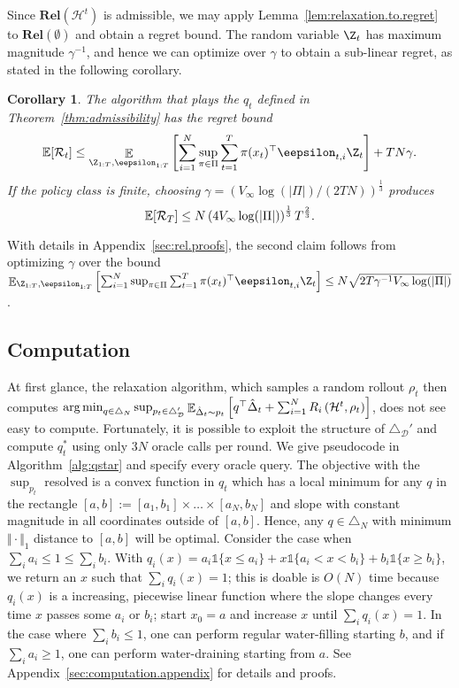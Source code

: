 \documentclass{article}
\newcommand{\exop}{\mathop{\ex}}
\newcommand{\regret}{\mathcal{R}}
\newcommand{\rel}{\mathbf{Rel}}
\newcommand{\hist}{{\mathcal H}}
\newtheorem{corollary}{Corollary}
\begin{document}
Since $\rel(\hist^t)$ is admissible, we may apply Lemma~\ref{lem:relaxation.to.regret} to $\rel(\emptyset)$ and obtain a regret bound. The random variable $\Z_t$ has maximum magnitude $\gamma^{-1}$, and hence we can optimize over $\gamma$ to obtain a sub-linear regret, as stated in the following corollary.
\begin{corollary}\label{cor:oracle.regret.bound}
  The algorithm that plays the $q_t$ defined in Theorem~\ref{thm:admissibility} has the regret bound
  \begin{equation*}
    \ex[\regret_t]
    \leq
    \exop_{\Z_{1:T},\eepsilon_{1:T}}\left[\sum_{i=1}^N\sup_{\pi\in\Pi} \sum_{t=1}^T \pi(x_t)^\top\eepsilon_{t,i} \Z_t \right]
    +
    T N \gamma.
  \end{equation*}
  If the policy class is finite, choosing $\gamma = \left(V_\infty\log(|\Pi|)/(2 TN) \right)^{\frac13}$ produces 
  \begin{equation}\label{eqn:rel.finite.regret}
    \mathbb E[\mathcal R_T] \leq N \left(4 V_\infty \log(|\Pi|)\right)^{\frac13} T^{\frac23}.
  \end{equation} 
\end{corollary}
With details in Appendix~\ref{sec:rel.proofs}, 
the second claim follows from optimizing $\gamma$ over the bound
$\exop_{\Z_{1:T},\eepsilon_{1:T}}\left[\sum_{i=1}^N\sup_{\pi\in\Pi} \sum_{t=1}^T \pi(x_t)^\top\eepsilon_{t,i} \Z_t \right] \leq N\sqrt{2T\gamma^{-1}V_\infty \log(|\Pi|)}$.

\subsection{Computation}
At first glance, the relaxation algorithm, which samples a random rollout $\rho_t$ then computes 
$
  \argmin_{q \in \triangle_{N}}
  \sup_{p_t \in \triangle_{\mathcal D}'} 
    \exop_{\hat\Delta_t \sim p_t}\left[
    q^\top\hat\Delta_t
    +  \sum_{i=1}^N R_i \left(\hist^{t},\rho_t\right)
    \right]
    $,
does not see easy to compute. Fortunately, it is possible to exploit the structure of $\triangle_{\mathcal D}'$ and compute $q_t^*$ using only $3N$ oracle calls per round. We give pseudocode in Algorithm~\ref{alg:qstar} and specify every oracle query. The objective with the $\sup_{p_t}$ resolved is a convex function in $q_t$ which has a local minimum for any $q$ in the rectangle $[a,b]:=[a_1,b_1]\times\ldots\times[a_N,b_N]$ and slope with constant magnitude in all coordinates outside of $[a,b]$. Hence, any $q\in\triangle_N$ with minimum $\Vert\cdot\Vert_1$ distance to $[a,b]$ will be optimal. Consider the case when $\sum_i a_i \leq 1 \leq \sum_i b_i$. With $q_i(x) = a_i\mathds{1}\{x\leq a_i\} + x\mathds{1}\{a_i<x<b_i\} + b_i\mathds{1}\{x\geq b_i\}$, we return an $x$ such that $\sum_i q_i(x) = 1$; this is doable is $O(N)$ time because $q_i(x)$ is a increasing, piecewise linear function where the slope changes every time $x$ passes some $a_i$ or $b_i$; start $x_0 = a$ and increase $x$ until $\sum_i q_i(x)=1$. In the case where $\sum_i b_i \leq 1$, one can perform regular water-filling starting $b$, and if $\sum_i a_i \geq 1$, one can perform water-draining starting from $a$. See Appendix~\ref{sec:computation.appendix} for details and proofs. 
\end{document}
